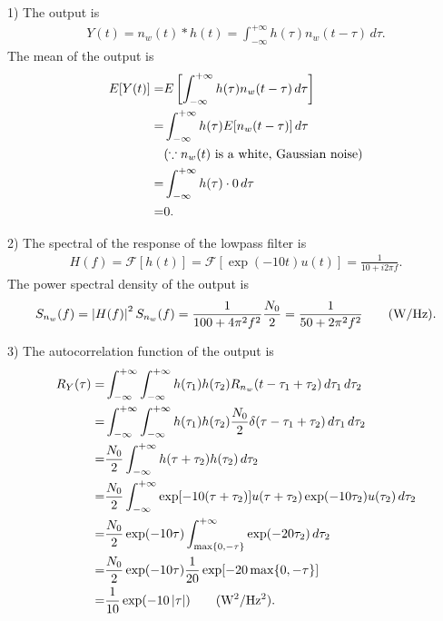 \documentclass{assignment}
\begin{document}
\begin{sol}
    \item[1)] The output is
    \begin{align}
        Y(t)=n_w(t)*h(t)=\int_{-\infty}^{+\infty}h(\tau)n_w(t-\tau)\,d\tau.
    \end{align}
    The mean of the output is
    \begin{align}
        \notag E[Y(t)]=&E\left[\int_{-\infty}^{+\infty}h(\tau)n_w(t-\tau)\,d\tau\right]\\
        \notag=&\int_{-\infty}^{+\infty}h(\tau)E[n_w(t-\tau)]\,d\tau\\
        \notag&(\because n_w(t)\text{ is a white, Gaussian noise})\\
        \notag=&\int_{-\infty}^{+\infty}h(\tau)\cdot 0\,d\tau\\
        =&0.
    \end{align}
    \item[2)] The spectral of the response of the lowpass filter is
    \begin{align}
        H(f)=\mathscr{F}[h(t)]=\mathscr{F}[\exp(-10t)u(t)]=\frac{1}{10+i2\pi f}.
    \end{align}
    The power spectral density of the output is
    \begin{align}
        S_{n_w}(f)=\left\lvert H(f)\right\rvert^2S_{n_w}(f)=\frac{1}{100+4\pi^2f^2}\frac{N_0}{2}=\frac{1}{50+2\pi^2f^2}\qquad(\text{W/Hz}).
    \end{align}
    \item[3)] The autocorrelation function of the output is
    \begin{align}
        \notag R_Y(\tau)=&\int_{-\infty}^{+\infty}\int_{-\infty}^{+\infty}h(\tau_1)h(\tau_2)R_{n_w}(t-\tau_1+\tau_2)\,d\tau_1\,d\tau_2\\
        \notag=&\int_{-\infty}^{+\infty}\int_{-\infty}^{+\infty}h(\tau_1)h(\tau_2)\frac{N_0}{2}\delta(\tau-\tau_1+\tau_2)\,d\tau_1\,d\tau_2\\
        \notag=&\frac{N_0}{2}\int_{-\infty}^{+\infty}h(\tau+\tau_2)h(\tau_2)\,d\tau_2\\
        \notag=&\frac{N_0}{2}\int_{-\infty}^{+\infty}\exp[-10(\tau+\tau_2)]u(\tau+\tau_2)\exp(-10\tau_2)u(\tau_2)\,d\tau_2\\
        \notag=&\frac{N_0}{2}\exp(-10\tau)\int_{\max\{0,-\tau\}}^{+\infty}\exp(-20\tau_2)\,d\tau_2\\
        \notag=&\frac{N_0}{2}\exp(-10\tau)\frac{1}{20}\exp[-20\max\{0,-\tau\}]\\
        =&\frac{1}{10}\exp(-10\abs{\tau})\qquad(\text{W$^2$/Hz$^2$}).

\end{align}
\end{sol}
\end{document}
